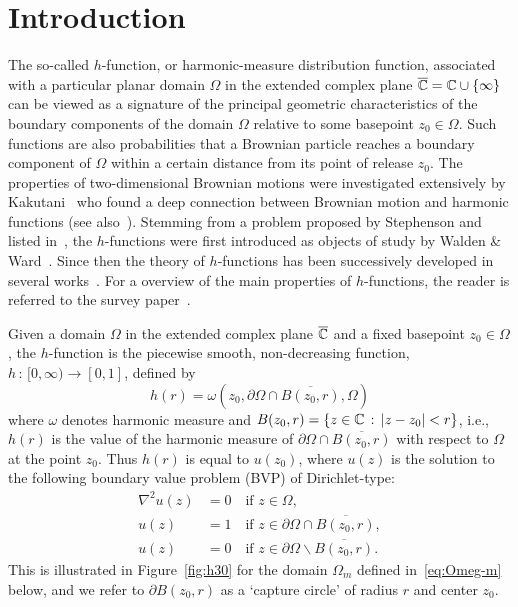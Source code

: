 \section{Introduction} \label{sec:int}

The so-called $h$-function, or harmonic-measure distribution function, associated with a particular planar domain $\Omega$ in the extended complex plane $\overline{{\mathbb C}}={\mathbb C}\cup\{\infty\}$ can be viewed as a signature of the principal geometric characteristics of the boundary components of the domain $\Omega$ relative to some basepoint $z_0\in\Omega$. Such functions are also probabilities that a Brownian particle reaches a boundary component of $\Omega$ within a certain distance from its point of release $z_0$. The properties of two-dimensional Brownian motions were investigated extensively by Kakutani~\cite{ka44} who found a deep connection between Brownian motion and harmonic functions (see also~\cite{ka45,SnipWard16,bookBM}).
Stemming from a problem proposed by Stephenson and listed in~\cite{bh89}, the $h$-functions were first introduced as objects of study by Walden \& Ward~\cite{wawa96}. Since then the theory of $h$-functions has been successively developed in several works~\cite{asww,bawa14,beso03,gswc,SnipWard05,SnipWard08,wawa96,wawa01,wawa07}. For a overview of the main properties of $h$-functions, the reader is referred to the survey paper~\cite{SnipWard16}. 

Given a domain $\Omega$ in the extended complex plane $\overline{{\mathbb C}}$ and a fixed basepoint $z_0\in\Omega$, the $h$-function is the piecewise smooth, non-decreasing function, $h\,:\,[0,\infty)\to[0,1]$, defined by
\begin{equation}\label{eq:hr}
h(r)= \omega(z_0,\partial\Omega\cap\overline{B(z_0,r)},\Omega)
\end{equation}
where $\omega$ denotes harmonic measure and $B(z_0,r)=\{z\in{\mathbb C}\,:\,|z-z_0|<r\}$, i.e., $h(r)$ is the value of the harmonic measure of $\partial\Omega\cap\overline{B(z_0,r)}$ with respect to $\Omega$ at the point $z_0$. 
Thus $h(r)$ is equal to $u(z_0)$, where $u(z)$ is the solution to the following boundary value problem (BVP) of Dirichlet-type:
\begin{subequations}\label{eq:bdv-u}
	\begin{align}
		\label{eq:u-Lap}
		\nabla^2 u(z) &= 0 \quad \mbox{if }z\in \Omega, \\
		\label{eq:u-1}
		u(z)&= 1 \quad \mbox{if }z\in \partial\Omega\cap\overline{B(z_0,r)}, \\
		\label{eq:u-0}
		u(z)&= 0 \quad \mbox{if }z\in \partial\Omega\backslash \overline{B(z_0,r)}. 
	\end{align}
\end{subequations}
This is illustrated in Figure~\ref{fig:h30} for the domain $\Omega_m$ defined in~\eqref{eq:Omeg-m} below, and we refer to $\partial B(z_0,r)$ as a `capture circle' of radius $r$ and center $z_0$.

